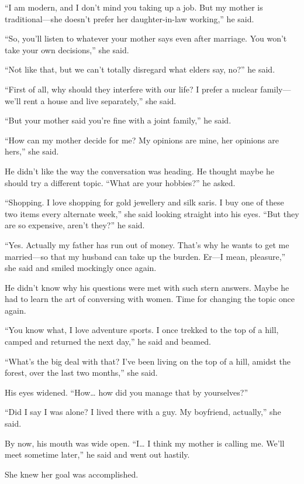 “I am modern, and I don't mind you taking up a job. But my mother is
traditional—she doesn't prefer her daughter-in-law working,” he said.

“So, you'll listen to whatever your mother says even after marriage. You won't
take your own decisions,” she said.

“Not like that, but we can't totally disregard what elders say, no?” he said.

“First of all, why should they interfere with our life? I prefer a nuclear
family—we'll rent a house and live separately,” she said.

“But your mother said you're fine with a joint family,” he said.

“How can my mother decide for me? My opinions are mine, her opinions are hers,”
she said.

He didn't like the way the conversation was heading. He thought maybe he should
try a different topic. “What are your hobbies?” he asked.

“Shopping. I love shopping for gold jewellery and silk saris. I buy one of these
two items every alternate week,” she said looking straight into his eyes.
“But they are so expensive, aren't they?” he said.

“Yes. Actually my father has run out of money. That's why he wants to get me
married—so that my husband can take up the burden. Er—I mean, pleasure,” she
said and smiled mockingly once again.

He didn't know why his questions were met with such stern answers. Maybe he had
to learn the art of conversing with women. Time for changing the topic once
again.

“You know what, I love adventure sports. I once trekked to the top of a hill,
camped and returned the next day,” he said and beamed.

“What's the big deal with that? I've been living on the top of a hill, amidst
the forest, over the last two months,” she said.

His eyes widened. “How… how did you manage that by yourselves?”

“Did I say I was alone? I lived there with a guy. My boyfriend, actually,” she
said.

By now, his mouth was wide open. “I… I think my mother is calling me. We'll
meet sometime later,” he said and went out hastily.

She knew her goal was accomplished.
